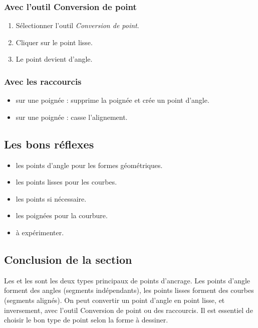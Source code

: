 \subsubsection{Avec l'outil Conversion de point}

\begin{enumerate}
    \item Sélectionner l'outil \emph{Conversion de point}.
    \item Cliquer sur le point lisse.
    \item Le point devient d'angle.
\end{enumerate}

\subsubsection{Avec les raccourcis}

\begin{itemize}
    \item {} sur une poignée : supprime la poignée et crée un point d'angle.
    \item {} sur une poignée : casse l'alignement.
\end{itemize}

\subsection{Les bons réflexes}

\begin{itemize}
    \item {} les points d'angle pour les formes géométriques.
    \item {} les points lisses pour les courbes.
    \item {} les points si nécessaire.
    \item {} les poignées pour la courbure.
    \item {} à expérimenter.
\end{itemize}

\subsection*{Conclusion de la section}

Les  et les  sont les deux types principaux de points d'ancrage. Les points d'angle forment des angles (segments indépendants), les points lisses forment des courbes (segments alignés). On peut convertir un point d'angle en point lisse, et inversement, avec l'outil Conversion de point ou des raccourcis. Il est essentiel de choisir le bon type de point selon la forme à dessiner.

